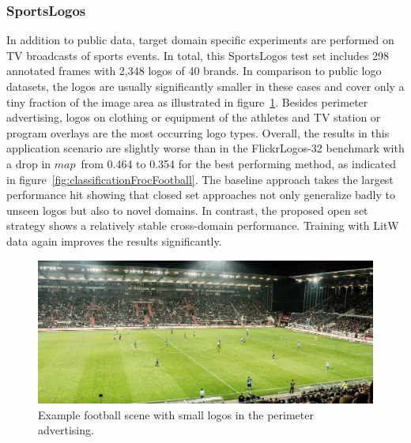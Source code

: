 \documentclass[a4paper,twoside]{article}
\newcommand{\map}{$\mathit{map}$}
\begin{document}
\subsubsection*{SportsLogos}
\vspace*{-2.5mm}
In addition to public data, target domain specific experiments are performed on TV broadcasts of sports events. In total, this SportsLogos test set includes 298 annotated frames with 2,348 logos of 40 brands. In comparison to public logo datasets, the logos are usually significantly smaller in these cases and cover only a tiny fraction of the image area as illustrated in figure~\ref{fig:footballSample}. Besides perimeter advertising, logos on clothing or equipment of the athletes and TV station or program overlays are the most occurring logo types.
Overall, the results in this application scenario are slightly worse than in the FlickrLogos-32 benchmark with a drop in \map~from 0.464 to 0.354 for the best performing method, as indicated in figure~\ref{fig:classificationFrocFootball}. The baseline approach takes the largest performance hit showing that closed set approaches not only generalize badly to unseen logos but also to novel domains. In contrast, the proposed open set strategy shows a relatively stable cross-domain performance. Training with \ac{LitW} data again improves the results significantly.
%
\begin{figure}%
\centering%
\includegraphics[width=\linewidth]{img/football-1908719_1920_cut.jpg}%
\caption{Example football scene with small logos in the perimeter advertising.}%
\label{fig:footballSample}
\end{figure}%
%
%
\end{document}

